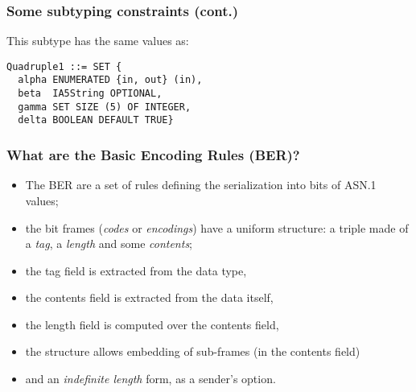 \documentclass[compress,dvips,xcolor={dvipsnames},t]{beamer}
\newcommand\ASN{\textsf{ASN.1}\xspace}
\begin{document}
\begin{frame}[containsverbatim]
\frametitle{Some subtyping constraints (cont.)}

This subtype has the same values as:
\begin{verbatim}
Quadruple1 ::= SET {
  alpha ENUMERATED {in, out} (in),
  beta  IA5String OPTIONAL,
  gamma SET SIZE (5) OF INTEGER,
  delta BOOLEAN DEFAULT TRUE}
\end{verbatim}

\end{frame}


\begin{frame}
\frametitle{What are the Basic Encoding Rules (BER)?}

\begin{itemize}

  \item The BER are a set of rules defining the serialization into
    bits of \ASN values;

  \item the bit frames (\emph{codes} or \emph{encodings}) have a
    uniform structure: a triple made of a \emph{tag}, a \emph{length}
    and some \emph{contents};

  \item the tag field is extracted from the data type,

  \item the contents field is extracted from the data itself,

  \item the length field is computed over the contents field,

  \item the structure allows embedding of sub-frames (in the contents
    field)

  \item and an \emph{indefinite length} form, as a sender's option.

\end{itemize}
\end{frame}
\end{document}
